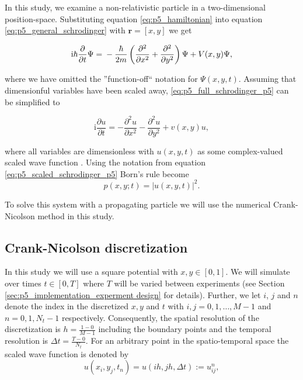 \documentclass[../main_proj5.tex]{subfiles}
\begin{document}
In this study, we examine a non-relativistic particle in a two-dimensional position-space. Substituting equation \eqref{eq:p5_hamiltonian} into equation \eqref{eq:p5_general_schrodinger} with $\mathbf{r}= [x, y]$ we get 


\begin{equation}
\label{eq:p5_full_schrodinger_p5}
    \text{i}\hbar \frac{\partial}{\partial t} \Psi = \\
    -\frac{\hbar}{2m}\left(\frac{\partial^{2}}{\partial x^{2}} + \frac{\partial^{2}}{\partial y^{2}}\right)\Psi + V(x,y)\Psi,
\end{equation}

\noindent where we have omitted the ''function-off`` notation for $\Psi(x,y,t)$. Assuming that dimensionful variables have been scaled away, \eqref{eq:p5_full_schrodinger_p5} can be simplified to 

\begin{equation}
\label{eq:p5_scaled_schrodinger_p5}
    \text{i}\frac{\partial u}{\partial t} =
    -\frac{\partial^{2}u}{\partial x^{2}} - \frac{\partial^{2} u}{\partial y^{2}} + v(x,y ) u,
\end{equation}

\noindent where all variables are dimensionless with $u(x,y,t)$ as some complex-valued scaled wave function \cite{prosjekttbeskrivelse5}. Using the notation from equation \eqref{eq:p5_scaled_schrodinger_p5} Born's rule become
\begin{equation}
    \label{eq:p5_scaled_borns_rule_positionspace}
    p(x,y;t) = |u(x,y,t)|^{2}.
\end{equation}

\noindent To solve this system with a propagating particle we will use the numerical Crank-Nicolson method in this study.


\subsection{Crank-Nicolson discretization}

In this study we will use a square potential with $x,y \in[0, 1]$. We will simulate over times $t\in[0, T]$ where $T$ will be varied between experiments (see Section \ref{sec:p5_implementation_experment design} for details). Further, we let $i$, $j$ and $n$ denote the index in the discretized $x, y$ and $t$ with $i,j = 0, 1, \dots, M-1$ and $n = 0, 1, N_t-1$ respectively. Consequently, the spatial resolution of the discretization is $h=\frac{1-0}{M-1}$ including the boundary points and the temporal resolution is $\Delta t = \frac{T-0}{N_t}$. For an arbitrary point in the spatio-temporal space the scaled wave function is denoted by 
\begin{equation}
\label{eq:p5_discretized_scaled_wavefunction}
u(x_i, y_j, t_n)=u(ih, jh, \Delta t):=u_{ij}^n ,    
\end{equation}
\end{document}
